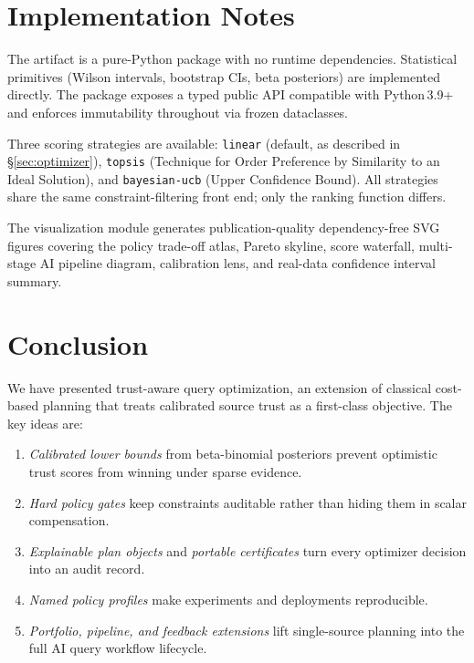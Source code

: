 \documentclass[runningheads]{llncs}
\begin{document}
\section{Implementation Notes}
\label{sec:impl}

The artifact is a pure-Python package with no runtime dependencies.
Statistical primitives (Wilson intervals, bootstrap CIs, beta posteriors)
are implemented directly.  The package exposes a typed public API
compatible with Python\,3.9+ and enforces immutability throughout via
frozen dataclasses.

Three scoring strategies are available: \texttt{linear} (default, as
described in \S\ref{sec:optimizer}), \texttt{topsis} (Technique for
Order Preference by Similarity to an Ideal Solution), and
\texttt{bayesian-ucb} (Upper Confidence Bound).  All strategies share
the same constraint-filtering front end; only the ranking function
differs.

The visualization module generates publication-quality dependency-free
SVG figures covering the policy trade-off atlas, Pareto skyline, score
waterfall, multi-stage AI pipeline diagram, calibration lens, and
real-data confidence interval summary.

\section{Conclusion}
\label{sec:conclusion}

We have presented trust-aware query optimization, an extension of
classical cost-based planning that treats calibrated source trust as a
first-class objective.  The key ideas are:
\begin{enumerate}
  \item \emph{Calibrated lower bounds} from beta-binomial posteriors
    prevent optimistic trust scores from winning under sparse evidence.
  \item \emph{Hard policy gates} keep constraints auditable rather than
    hiding them in scalar compensation.
  \item \emph{Explainable plan objects} and \emph{portable certificates}
    turn every optimizer decision into an audit record.
  \item \emph{Named policy profiles} make experiments and deployments
    reproducible.
  \item \emph{Portfolio, pipeline, and feedback extensions} lift
    single-source planning into the full AI query workflow lifecycle.
\end{enumerate}
\end{document}
